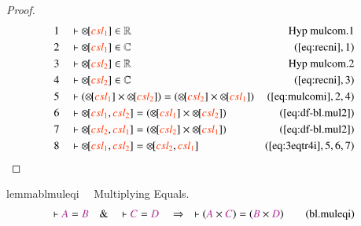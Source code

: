 \begin{proof}
\begin{align}
  1 &&  & \vdash {\otimes\hspace{-1pt}[} \msc{csl_1} ] \in
      \mathbb{R}&\text{Hyp~mulcom.1}\notag%
  \\ 2 &&  & \vdash {\otimes\hspace{-1pt}[} \msc{csl_1} ] \in
      \mathbb{C}&(\mbox{\ref{eq:recni}},1)\notag
  \\ 3 &&  & \vdash {\otimes\hspace{-1pt}[} \msc{csl_2} ] \in
      \mathbb{R}&\text{Hyp~mulcom.2}\notag%
  \\ 4 &&  & \vdash {\otimes\hspace{-1pt}[} \msc{csl_2} ] \in
      \mathbb{C}&(\mbox{\ref{eq:recni}},3)\notag
  \\ 5 &&  & \vdash ( {\otimes\hspace{-1pt}[} \msc{csl_1} ] \times
      {\otimes\hspace{-1pt}[} \msc{csl_2} ] ) = (
      {\otimes\hspace{-1pt}[} \msc{csl_2} ] \times
      {\otimes\hspace{-1pt}[} \msc{csl_1} ]
      )&(\mbox{\ref{eq:mulcomi}},2,4)\notag
  \\ 6 &&  & \vdash {\otimes\hspace{-1pt}[} \msc{csl_1} , \msc{csl_2} ] = (
      {\otimes\hspace{-1pt}[} \msc{csl_1} ] \times
      {\otimes\hspace{-1pt}[} \msc{csl_2} ]
      )&(\mbox{\ref{eq:df-bl.mul2}})\notag
  \\ 7 &&  & \vdash {\otimes\hspace{-1pt}[} \msc{csl_2} , \msc{csl_1} ] = (
      {\otimes\hspace{-1pt}[} \msc{csl_2} ] \times
      {\otimes\hspace{-1pt}[} \msc{csl_1} ]
      )&(\mbox{\ref{eq:df-bl.mul2}})\notag
  \\ 8 &&  & \vdash {\otimes\hspace{-1pt}[} \msc{csl_1} , \msc{csl_2} ] =
      {\otimes\hspace{-1pt}[} \msc{csl_2} , \msc{csl_1}
      ]&(\mbox{\ref{eq:3eqtr4i}},5,6,7)\notag
\end{align}
\end{proof}

\begin{restatable}{lemma}{blmuleqi}~~ Multiplying Equals.
\begin{align}
\vdash \mc{A} = \mc{B}\quad\&\quad \vdash \mc{C} = \mc{D}\quad\Rightarrow\quad
    \vdash ( \mc{A} \times \mc{C} ) = ( \mc{B} \times \mc{D}
    )\label{eq:bl.muleqi}\tag{bl.muleqi}
\end{align}
\end{restatable}


